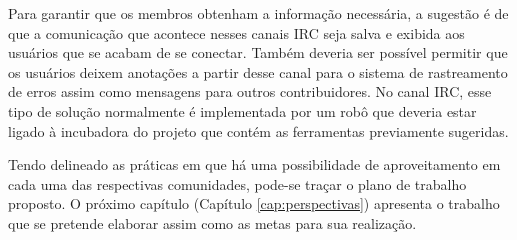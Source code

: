 Para garantir que os membros obtenham a informação necessária, a
sugestão é de que a comunicação que acontece nesses canais IRC seja
salva e exibida aos usuários que se acabam de se conectar. Também
deveria ser possível permitir que os usuários deixem anotações a
partir desse canal para o sistema de rastreamento de erros assim como
mensagens para outros contribuidores. No canal IRC, esse tipo de
solução normalmente é implementada por um robô que deveria estar
ligado à incubadora do projeto que contém as ferramentas previamente
sugeridas.

Tendo delineado as práticas em que há uma possibilidade de
aproveitamento em cada uma das respectivas comunidades, pode-se traçar
o plano de trabalho proposto. O próximo capítulo (Capítulo
\ref{cap:perspectivas}) apresenta o trabalho que se pretende elaborar
assim como as metas para sua realização.
